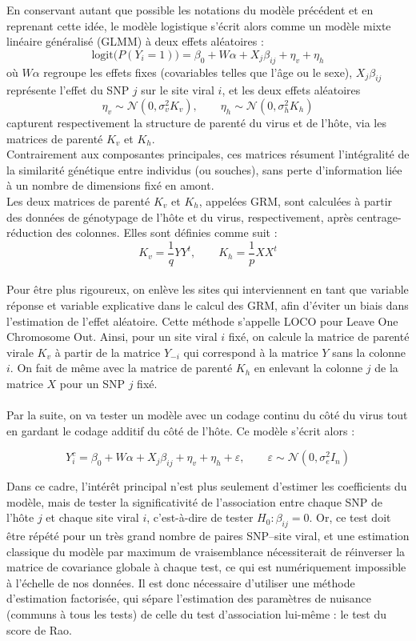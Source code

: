 \documentclass[11pt,a4paper]{article}
\begin{document}
En conservant autant que possible les notations du modèle précédent et en reprenant cette idée, le modèle logistique s'écrit alors comme un modèle
mixte linéaire généralisé (GLMM) à deux effets aléatoires :
\[
    \text{logit}\big(P(Y_i = 1)\big) = \beta_0 + W\alpha + X_j \beta_{ij}
    + \eta_v + \eta_h
\]
où $W\alpha$ regroupe les effets fixes (covariables telles que l'âge ou le sexe),
$X_j \beta_{ij}$ représente l'effet du SNP $j$ sur le site viral $i$,
et les deux effets aléatoires
\[
\eta_v \sim \mathcal{N}(0, \sigma^2_v K_v), \qquad
\eta_h \sim \mathcal{N}(0, \sigma^2_h K_h)
\]
capturent respectivement la structure de parenté du virus et de
l'hôte, via les matrices de parenté $K_v$ et $K_h$.
\\
Contrairement aux composantes principales, ces matrices résument l'intégralité de la
similarité génétique entre individus (ou souches), sans perte d'information
liée à un nombre de dimensions fixé en amont.
\\
Les deux matrices de parenté $K_v$ et $K_h$, appelées GRM, sont calculées à partir des données de génotypage de l'hôte et du virus, respectivement, après centrage-réduction des colonnes. Elles sont définies comme suit :
\[
K_v = \frac{1}{q}YY^t, \qquad K_h = \frac{1}{p}XX^t
\]
\\
Pour être plus rigoureux, on enlève les sites qui interviennent en tant que variable réponse et variable explicative dans le calcul des GRM, afin d'éviter un biais dans l'estimation de l'effet aléatoire.
Cette méthode s'appelle LOCO pour Leave One Chromosome Out. Ainsi, pour un site viral $i$ fixé, on calcule la matrice de parenté virale $K_v$ à partir de la matrice $Y_{-i}$ qui correspond à la matrice $Y$ sans la colonne $i$.
On fait de même avec la matrice de parenté $K_h$ en enlevant la colonne $j$ de la matrice $X$ pour un SNP $j$ fixé.
\\
\\
Par la suite, on va tester un modèle avec un codage continu du côté du virus tout en gardant le codage additif du côté de l'hôte. Ce modèle s'écrit alors :

\[
Y^c_i = \beta_0 + W\alpha + X_j \beta_{ij} + \eta_v + \eta_h + \varepsilon,
\qquad \varepsilon \sim \mathcal{N}(0, \sigma^2_e I_n)
\]


Dans ce cadre, l'intérêt principal n'est plus seulement d'estimer les
coefficients du modèle, mais de tester la significativité de
l'association entre chaque SNP de l'hôte $j$ et chaque site viral $i$,
c'est-à-dire de tester $H_0 : \beta_{ij} = 0$. Or, ce test doit être répété
pour un très grand nombre de paires SNP--site viral, et une estimation
classique du modèle par maximum de vraisemblance nécessiterait de réinverser
la matrice de covariance globale à chaque test, ce qui est numériquement
impossible à l'échelle de nos données. Il est donc nécessaire d'utiliser une
méthode d'estimation factorisée, qui sépare l'estimation des paramètres de
nuisance (communs à tous les tests) de celle du test d'association
lui-même : le test du score de Rao.
\end{document}
